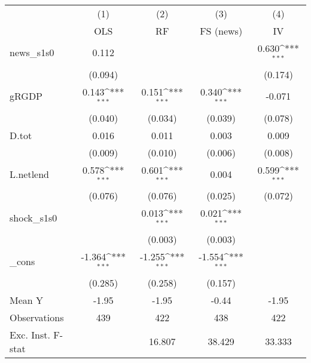 {
\def\sym#1{\ifmmode^{#1}\else\(^{#1}\)\fi}
\begin{tabular}{l*{4}{c}}
\toprule
            &\multicolumn{1}{c}{(1)}&\multicolumn{1}{c}{(2)}&\multicolumn{1}{c}{(3)}&\multicolumn{1}{c}{(4)}\\
            &\multicolumn{1}{c}{OLS}&\multicolumn{1}{c}{RF}&\multicolumn{1}{c}{FS (news)}&\multicolumn{1}{c}{IV}\\
\midrule
news\_s1s0   &       0.112         &                     &                     &       0.630\sym{***}\\
            &     (0.094)         &                     &                     &     (0.174)         \\
\addlinespace
gRGDP       &       0.143\sym{***}&       0.151\sym{***}&       0.340\sym{***}&      -0.071         \\
            &     (0.040)         &     (0.034)         &     (0.039)         &     (0.078)         \\
\addlinespace
D.tot       &       0.016         &       0.011         &       0.003         &       0.009         \\
            &     (0.009)         &     (0.010)         &     (0.006)         &     (0.008)         \\
\addlinespace
L.netlend   &       0.578\sym{***}&       0.601\sym{***}&       0.004         &       0.599\sym{***}\\
            &     (0.076)         &     (0.076)         &     (0.025)         &     (0.072)         \\
\addlinespace
shock\_s1s0  &                     &       0.013\sym{***}&       0.021\sym{***}&                     \\
            &                     &     (0.003)         &     (0.003)         &                     \\
\addlinespace
\_cons      &      -1.364\sym{***}&      -1.255\sym{***}&      -1.554\sym{***}&                     \\
            &     (0.285)         &     (0.258)         &     (0.157)         &                     \\
\midrule
Mean Y      &       -1.95         &       -1.95         &       -0.44         &       -1.95         \\
Observations&         439         &         422         &         438         &         422         \\
Exc. Inst. F-stat&                     &      16.807         &      38.429         &      33.333         \\
\bottomrule
\end{tabular}
}
